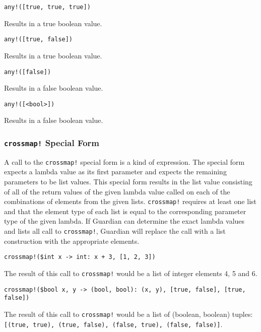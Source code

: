 {{		\begin{itemize}
		{
			\item[] \texttt{any!([true, true, true])}
			
				Results in a true boolean value.
			
			\item[] \texttt{any!([true, false])}
			
				Results in a true boolean value.
			
			\item[] \texttt{any!([false])}
			
				Results in a false boolean value.
			
			\item[] \texttt{any!([<bool>])}
			
				Results in a false boolean value.
		}
		\end{itemize}
	}
	
	\subsubsection{\texttt{crossmap!} Special Form}
	{
		A call to the \texttt{crossmap!} special form is a kind of expression.
		The special form expects a lambda value as its
		first parameter and expects the remaining parameters to be list values.
		This special form results in the list value consisting
		of all of the return values of the given lambda value called on each of
		the combinations of elements from the given lists.
		\texttt{crossmap!} requires at least one list and that
		the element type of each list is equal to the corresponding parameter type
		of the given lambda.
		If Guardian can determine the exact lambda values and lists all call to
		\texttt{crossmap!}, Guardian will replace the call with a list
		construction with the appropriate elements.
		
		\begin{itemize}
		{
			\item[] \texttt{crossmap!(\$int x -> int: x + 3, [1, 2, 3])}
			
				The result of this call to \texttt{crossmap!} would be a list of
				integer elements 4, 5 and 6.
			
			\item[] \texttt{crossmap!(\$bool x, y -> (bool, bool): (x, y), [true, false], [true, false])}
			
				The result of this call to \texttt{crossmap!} would be a list of
				(boolean, boolean)
				tuples: \texttt{[(true, true), (true, false), (false, true), (false, false)]}.
		}
		\end{itemize}
	}
	
}
